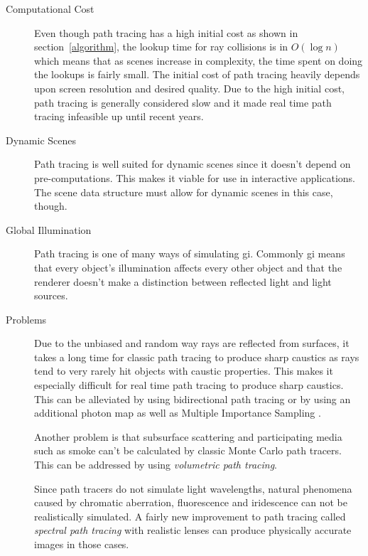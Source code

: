 \documentclass[
  twoside,
  11pt, a4paper,
  footinclude=true,
  headinclude=true,
  cleardoublepage=empty
]{scrreprt}
\begin{document}
\begin{description}
    \item[Computational Cost]
        Even though path tracing has a high initial cost as shown in section~\ref{algorithm}, the lookup time for ray collisions is in
        \(O(\log n)\) which means that as scenes increase in complexity, the time spent on doing the
        lookups is fairly small. The initial cost of path tracing heavily depends upon screen resolution
        and desired quality. Due to the high initial cost, path tracing is generally considered slow and
        it made real time path tracing infeasible up until recent years.

    \item[Dynamic Scenes]
        Path tracing is well suited for dynamic scenes since it doesn't depend on pre-computations. This
        makes it viable for use in interactive applications. The scene data structure must allow for
        dynamic scenes in this case, though.

    \item[Global Illumination]
        Path tracing is one of many ways of simulating \acf{gi}.
        Commonly \ac{gi} means that every object's illumination affects every other object and that the
        renderer doesn't make a distinction between reflected light and light sources.

    \item[Problems]
        Due to the unbiased and random way rays are reflected from surfaces, it takes a long time for
        classic path tracing to
        produce sharp caustics as rays tend to very rarely hit objects with caustic properties. This makes
        it especially difficult for real time path tracing to produce sharp caustics. This can be
        alleviated by using bidirectional path tracing \cite{techreport:pbr} or by using an
        additional photon map as well as Multiple Importance Sampling \cite{veach1997robust}.

        Another problem is that subsurface scattering and participating media such as smoke can't be
        calculated by classic Monte Carlo path
        tracers. This can be addressed by using \emph{volumetric path tracing}.
        \cite{wiki:volumetric-path-tracing} \cite{incollection:volumetric-path-tracing}

        Since path tracers do not simulate light wavelengths, natural phenomena caused by chromatic
        aberration, fluorescence and iridescence can not be realistically simulated. A fairly new
        improvement to path tracing called \emph{spectral path tracing} with realistic lenses can produce
        physically accurate images in those cases. \cite{inproceedings:realistic-lenses} \cite{site:lambda}
        \cite{site:luculentus} \cite{site:robigo-luculenta}
\end{description}
\end{document}
